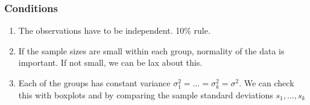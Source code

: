 \documentclass[handout]{beamer}
\newcommand{\blue}[1]{\textcolor{blue2}{#1}}
\begin{document}
\begin{frame}
\frametitle{Conditions}
\begin{enumerate}
\pause \item The observations have to be \blue{independent}.  10\% rule.  
\pause \item If the sample sizes are small within each group, \blue{normality} of the data is important.  If not small, we can be lax about this. 
\pause \item Each of the groups has \blue{constant variance} $\sigma_1^2 = \ldots = \sigma_k^2 = \sigma^2$.  We can check this with boxplots and by comparing the sample standard deviations $s_1, \ldots, s_k$
\end{enumerate}

\end{frame}
\end{document}
